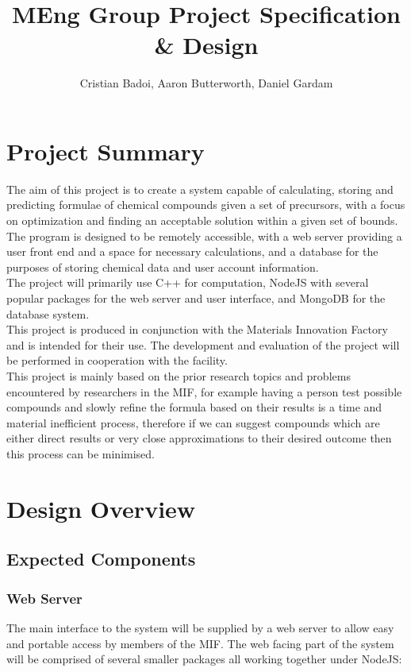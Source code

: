 \documentclass[a4paper, 12pt]{article}
\title{MEng Group Project Specification \& Design}
\author{Cristian Badoi, Aaron Butterworth, Daniel Gardam}
\date{}
\begin{document}
\maketitle

\section{Project Summary}
The aim of this project is to create a system capable of calculating, storing and predicting formulae of chemical compounds given a set of precursors, with a focus on optimization and finding an acceptable solution within a given set of bounds. The program is designed to be remotely accessible, with a web server providing a user front end and a space for necessary calculations, and a database for the purposes of storing chemical data and user account information. \\

The project will primarily use C++ for computation, NodeJS with several popular packages for the web server and user interface, and MongoDB for the database system. \\

This project is produced in conjunction with the Materials Innovation Factory and is intended for their use. The development and evaluation of the project will be performed in cooperation with the facility. \\

This project is mainly based on the prior research topics and problems encountered by researchers in the MIF, for example having a person test possible compounds and slowly refine the formula based on their results is a time and material inefficient process, therefore if we can suggest compounds which are either direct results or very close approximations to their desired outcome then this process can be minimised. \\

\section{Design Overview}
\subsection{Expected Components}
\subsubsection{Web Server}
The main interface to the system will be supplied by a web server to allow easy and portable access by members of the MIF. The web facing part of the system will be comprised of several smaller packages all working together under NodeJS:
\end{document}

